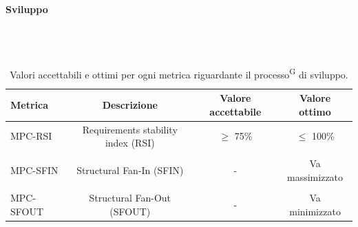 \documentclass[8pt]{article}
\newcommand{\glossterm}[1]{#1\textsuperscript{G}} %
\newcommand{\subsubsubsection}[1]{\paragraph{#1}\mbox{}\\\\}
\begin{document}
\clearpage
\subsubsubsection{Sviluppo}
\begin{table}[h]	
	\centering
	\begin{tabular}{lccc}
		\toprule
		\textbf{Metrica}& \textbf{Descrizione} & \textbf{Valore accettabile} & \textbf{Valore ottimo} \\
		\midrule
		MPC-RSI & Requirements stability index (RSI) & $\geq $ 75\%  & $\leq$ 100\% \\\\
		MPC-SFIN & Structural Fan-In (SFIN) & - & Va massimizzato\\\\
		MPC-SFOUT & Structural Fan-Out (SFOUT) & - & Va minimizzato\\
		\bottomrule
	\end{tabular}
	\caption{Valori accettabili e ottimi per ogni metrica riguardante il \glossterm{processo} di sviluppo.}
	\label{table:Valori accettabili e ottimi per ogni metrica riguardante il processo di sviluppo.}
\end{table}
\end{document}
